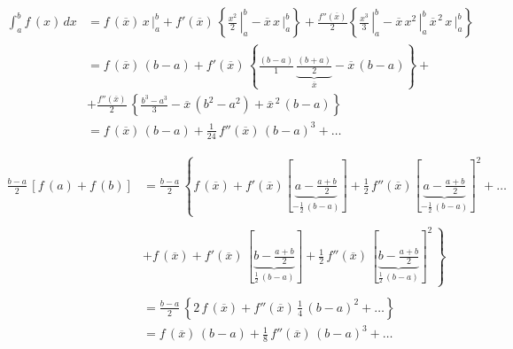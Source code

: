 \begin{equation}
 \label{cap2:sec2:eqA}
 \begin{array}{ll}
  \displaystyle \int_a^b f\,(x) \, dx & = f\,(\overline{x}) \left. \, x \, \right|_a^b + f'(\overline{x}) \, \left\{ \left. \displaystyle \frac{x^2}{2} \, \right|_a^b - \overline{x} \left. \, x \, \right|_a^b \right\} + \displaystyle \frac{f''(\overline{x})}{2} \left\{ \left. \frac{x^3}{3} \, \right|_a^b - \overline{x} \left. \, x^2 \, \right|_a^b \, \overline{x}^{\,2} \left. \, x \, \right|_a^b \right\} \\
                        & = f\,(\overline{x}) \, (b - a) + f'(\overline{x}) \, \left\{ \displaystyle \frac{(b - a)}{1} \, \underbrace{\frac{(b + a)}{2}}_{\overline{x}} - \overline{x} \, (b - a) \right\} + \\
                        & + \displaystyle \frac{f''(\overline{x})}{2} \, \left\{ \frac{b^3 - a^3}{3} - \overline{x} \, (b^2 - a^2) + \overline{x}^{\,2} \, (b - a) \right\} \\
                        & = f\,(\overline{x}) \, (b - a) + \displaystyle \frac{1}{24} \, f''(\overline{x}) \, (b - a)^3 + \ldots
 \end{array}
\end{equation}

\begin{equation}
 \label{cap2:sec2:eqB}
 \begin{array}{ll}
  \displaystyle \frac{b - a}{2} \, [f\,(a) + f\,(b)] & = \displaystyle \frac{b - a}{2} \, \left\{ f\,(\overline{x}) + f'(\overline{x}) \left[ \underbrace{a - \frac{a + b}{2}}_{-\frac{1}{2}\,(b - a)} \right] + \frac{1}{2}\,f''(\overline{x}) \left[ \underbrace{a - \frac{a + b}{2}}_{-\frac{1}{2}\,(b - a)} \right]^2 + \ldots \right. \\
  \\
  & \left. + f\,(\overline{x}) + f'(\overline{x}) \, \left[ \underbrace{b - \frac{a + b}{2}}_{\frac{1}{2} \, (b - a)} \right] + \frac{1}{2} \, f''(\overline{x}) \, \left[ \underbrace{b - \frac{a + b}{2}}_{\frac{1}{2} \, (b - a)} \right]^2 \, \right\} \\
  \\
  & = \displaystyle \frac{b - a}{2} \, \left\{ 2\,f\,(\overline{x}) + f''(\overline{x}) \, \frac{1}{4} \, (b - a)^2 + \ldots \right\} \\
  & = f\,(\overline{x}) \, (b - a) + \displaystyle \frac{1}{8} \, f''(\overline{x}) \, (b - a)^3 + \ldots
 \end{array}
\end{equation}

